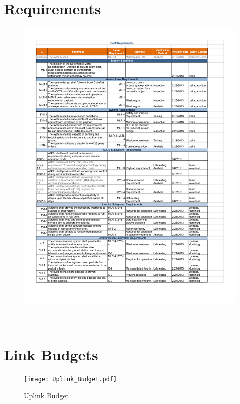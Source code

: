 \documentclass[12pt]{article}
\begin{document}
	

\newpage
\appendix
\section{\\Requirements} \label{app:requirements}

	\begin{figure}[!ht]
				\centering
				\includegraphics{images/Requirements.pdf}
				\label{fig:Requirements}
			\end{figure}

\newpage
\section{\\Link Budgets} \label{app:link_budgets}

\begin{figure}[ht]
\centering 
\caption{Uplink Budget}
\texttt{[image: Uplink\_Budget.pdf]}
\end{figure}
\end{document}
